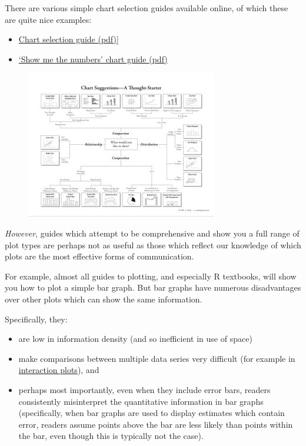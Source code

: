 \documentclass[]{article}
\providecommand{\tightlist}{%
  \setlength{\itemsep}{0pt}\setlength{\parskip}{0pt}}
\theoremstyle{definition}
\theoremstyle{definition}
\theoremstyle{definition}
\theoremstyle{remark}
\begin{document}
There are various simple chart selection guides available online, of
which these are quite nice examples:

\begin{itemize}
\tightlist
\item
  \href{http://extremepresentation.typepad.com/blog/2006/09/choosing_a_good.html}{Chart
  selection guide (pdf)}{]}
\item
  \href{https://www.perceptualedge.com/articles/misc/Graph_Selection_Matrix.pdf}{`Show
  me the numbers' chart guide (pdf)}
\end{itemize}

\begin{figure}
\centering
\includegraphics{media/choosing_a_good_chart.jpg}
\caption{}
\end{figure}

\emph{However}, guides which attempt to be comprehensive and show you a
full range of plot types are perhaps not as useful as those which
reflect our knowledge of which plots are the most effective forms of
communication.

For example, almost all guides to plotting, and especially R textbooks,
will show you how to plot a simple bar graph. But bar graphs have
numerous disadvantages over other plots which can show the same
information.

Specifically, they:

\begin{itemize}
\item
  are low in information density (and so inefficient in use of space)
\item
  make comparisons between multiple data series very difficult (for
  example in \protect\hyperlink{understanding-interactions}{interaction
  plots}), and
\item
  perhaps most importantly, even when they include error bars, readers
  consistently misinterpret the quantitative information in bar graphs
  (specifically, when bar graphs are used to display estimates which
  contain error, readers assume points above the bar are less likely
  than points within the bar, even though this is typically not the
  case).
\end{itemize}
\end{document}
